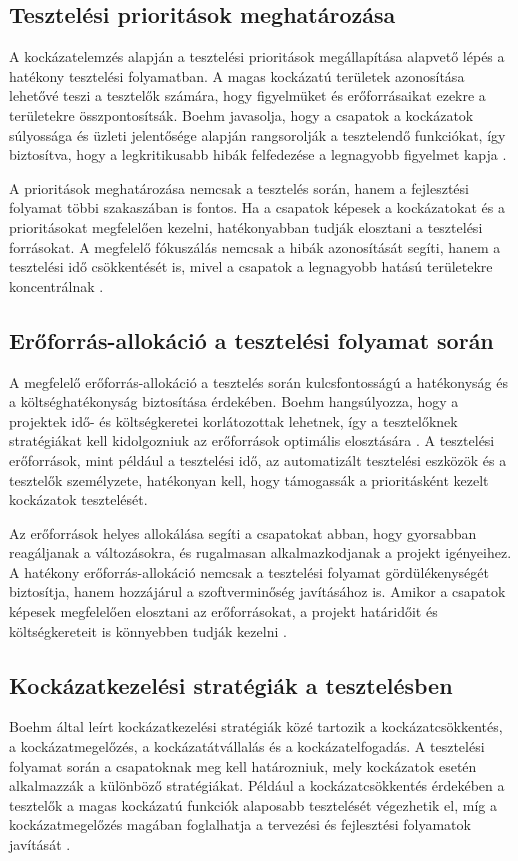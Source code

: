 \subsection{Tesztelési prioritások meghatározása}
A kockázatelemzés alapján a tesztelési prioritások megállapítása alapvető lépés a hatékony tesztelési folyamatban. A magas kockázatú területek azonosítása lehetővé teszi a tesztelők számára, hogy figyelmüket és erőforrásaikat ezekre a területekre összpontosítsák. Boehm javasolja, hogy a csapatok a kockázatok súlyossága és üzleti jelentősége alapján rangsorolják a tesztelendő funkciókat, így biztosítva, hogy a legkritikusabb hibák felfedezése a legnagyobb figyelmet kapja \cite[102]{boehm1989software}.

A prioritások meghatározása nemcsak a tesztelés során, hanem a fejlesztési folyamat többi szakaszában is fontos. Ha a csapatok képesek a kockázatokat és a prioritásokat megfelelően kezelni, hatékonyabban tudják elosztani a tesztelési forrásokat. A megfelelő fókuszálás nemcsak a hibák azonosítását segíti, hanem a tesztelési idő csökkentését is, mivel a csapatok a legnagyobb hatású területekre koncentrálnak \cite[114]{boehm1989software}.

\subsection{Erőforrás-allokáció a tesztelési folyamat során}
A megfelelő erőforrás-allokáció a tesztelés során kulcsfontosságú a hatékonyság és a költséghatékonyság biztosítása érdekében. Boehm hangsúlyozza, hogy a projektek idő- és költségkeretei korlátozottak lehetnek, így a tesztelőknek stratégiákat kell kidolgozniuk az erőforrások optimális elosztására \cite[133]{boehm1989software}. A tesztelési erőforrások, mint például a tesztelési idő, az automatizált tesztelési eszközök és a tesztelők személyzete, hatékonyan kell, hogy támogassák a prioritásként kezelt kockázatok tesztelését.

Az erőforrások helyes allokálása segíti a csapatokat abban, hogy gyorsabban reagáljanak a változásokra, és rugalmasan alkalmazkodjanak a projekt igényeihez. A hatékony erőforrás-allokáció nemcsak a tesztelési folyamat gördülékenységét biztosítja, hanem hozzájárul a szoftverminőség javításához is. Amikor a csapatok képesek megfelelően elosztani az erőforrásokat, a projekt határidőit és költségkereteit is könnyebben tudják kezelni \cite[145]{boehm1989software}.

\subsection{Kockázatkezelési stratégiák a tesztelésben}
Boehm által leírt kockázatkezelési stratégiák közé tartozik a kockázatcsökkentés, a kockázatmegelőzés, a kockázatátvállalás és a kockázatelfogadás. A tesztelési folyamat során a csapatoknak meg kell határozniuk, mely kockázatok esetén alkalmazzák a különböző stratégiákat. Például a kockázatcsökkentés érdekében a tesztelők a magas kockázatú funkciók alaposabb tesztelését végezhetik el, míg a kockázatmegelőzés magában foglalhatja a tervezési és fejlesztési folyamatok javítását \cite[162]{boehm1989software}.

